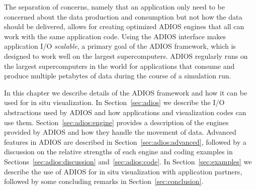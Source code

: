 The separation of concerns, namely that an application only need to be concerned about the data production and consumption but not how the data should be delivered, allows for creating optimized ADIOS engines that all can work with the same application code.
Using the ADIOS interface makes application I/O \emph{scalable}, a primary goal of the ADIOS framework, which is designed to work well on the largest supercomputers. ADIOS regularly runs on the largest supercomputers in the world for applications that consume and produce multiple petabytes of data during the course of a simulation run.


In this chapter we describe details of the ADIOS framework and how it can be used for in situ visualization. In Section~\ref{sec:adios} we describe the I/O abstractions used by ADIOS and how applications and visualization codes can use them. Section~\ref{sec:adios:engine} provides a description of the engines provided by ADIOS and how they handle the movement of data. Advanced features in ADIOS are described in Section~\ref{sec:adios:advanced}, followed by a  discussion on the relative strengths of each engine and coding examples in Sections~\ref{sec:adios:discussion} and~\ref{sec:adios:code}. In Section~\ref{sec:examples} we describe the use of ADIOS for in situ visualization with application partners, followed by some concluding remarks in Section~\ref{sec:conclusion}.



